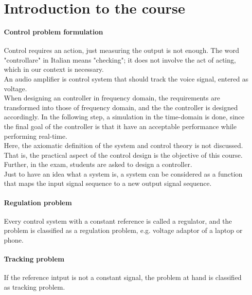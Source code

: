 \chapter{Introduction to the course}

\subsubsection{Control problem formulation}
Control requires an action, just measuring the output is not enough. The word "controllare" in Italian means "checking"; it does not involve the act of acting, which in our context is necessary.\\
An audio amplifier is control system that should track the voice signal, entered as voltage.\\

When designing an controller in frequency domain, the requirements are transformed into those of frequency domain, and the the controller is designed accordingly. In the following step, a simulation in the time-domain is done, since the final goal of the controller is that it have an acceptable performance while performing real-time.\\

Here, the axiomatic definition of the system and control theory is not discussed. That is, the practical aspect of the control design is the objective of this course. Further, in the exam, students are asked to design a controller.\\

Just to have an idea what a system is, a system can be considered as a function that maps the input signal sequence to a new output signal sequence.\\

\subsubsection{Regulation problem}
Every control system with a constant reference is called a regulator, and the problem is classified as a regulation problem, e.g. voltage adaptor of a laptop or phone.\\

\subsubsection{Tracking problem}
If the reference intput is not a constant signal, the problem at hand is classified as tracking problem.\\

